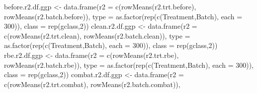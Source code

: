 \documentclass[
]{book}
\newenvironment{Shaded}{\begin{snugshade}}{\end{snugshade}}
\newcommand{\AttributeTok}[1]{\textcolor[rgb]{0.77,0.63,0.00}{#1}}
\newcommand{\DecValTok}[1]{\textcolor[rgb]{0.00,0.00,0.81}{#1}}
\newcommand{\FunctionTok}[1]{\textcolor[rgb]{0.00,0.00,0.00}{#1}}
\newcommand{\NormalTok}[1]{#1}
\newcommand{\OtherTok}[1]{\textcolor[rgb]{0.56,0.35,0.01}{#1}}
\newcommand{\StringTok}[1]{\textcolor[rgb]{0.31,0.60,0.02}{#1}}
\begin{document}
\begin{Shaded}
\begin{Highlighting}[]
\NormalTok{before.r2.df.ggp }\OtherTok{\textless{}{-}} \FunctionTok{data.frame}\NormalTok{(}\AttributeTok{r2 =} \FunctionTok{c}\NormalTok{(}\FunctionTok{rowMeans}\NormalTok{(r2.trt.before), }
                                      \FunctionTok{rowMeans}\NormalTok{(r2.batch.before)), }
                               \AttributeTok{type =} \FunctionTok{as.factor}\NormalTok{(}\FunctionTok{rep}\NormalTok{(}\FunctionTok{c}\NormalTok{(}\StringTok{\textquotesingle{}Treatment\textquotesingle{}}\NormalTok{,}\StringTok{\textquotesingle{}Batch\textquotesingle{}}\NormalTok{), }
                                                    \AttributeTok{each =} \DecValTok{300}\NormalTok{)),}
                               \AttributeTok{class =} \FunctionTok{rep}\NormalTok{(gclass,}\DecValTok{2}\NormalTok{))}
\NormalTok{clean.r2.df.ggp }\OtherTok{\textless{}{-}} \FunctionTok{data.frame}\NormalTok{(}\AttributeTok{r2 =} \FunctionTok{c}\NormalTok{(}\FunctionTok{rowMeans}\NormalTok{(r2.trt.clean), }
                                     \FunctionTok{rowMeans}\NormalTok{(r2.batch.clean)), }
                              \AttributeTok{type =} \FunctionTok{as.factor}\NormalTok{(}\FunctionTok{rep}\NormalTok{(}\FunctionTok{c}\NormalTok{(}\StringTok{\textquotesingle{}Treatment\textquotesingle{}}\NormalTok{,}\StringTok{\textquotesingle{}Batch\textquotesingle{}}\NormalTok{), }
                                                   \AttributeTok{each =} \DecValTok{300}\NormalTok{)),}
                              \AttributeTok{class =} \FunctionTok{rep}\NormalTok{(gclass,}\DecValTok{2}\NormalTok{))}
\NormalTok{rbe.r2.df.ggp }\OtherTok{\textless{}{-}} \FunctionTok{data.frame}\NormalTok{(}\AttributeTok{r2 =} \FunctionTok{c}\NormalTok{(}\FunctionTok{rowMeans}\NormalTok{(r2.trt.rbe), }
                                   \FunctionTok{rowMeans}\NormalTok{(r2.batch.rbe)), }
                            \AttributeTok{type =} \FunctionTok{as.factor}\NormalTok{(}\FunctionTok{rep}\NormalTok{(}\FunctionTok{c}\NormalTok{(}\StringTok{\textquotesingle{}Treatment\textquotesingle{}}\NormalTok{,}\StringTok{\textquotesingle{}Batch\textquotesingle{}}\NormalTok{), }
                                                 \AttributeTok{each =} \DecValTok{300}\NormalTok{)),}
                            \AttributeTok{class =} \FunctionTok{rep}\NormalTok{(gclass,}\DecValTok{2}\NormalTok{))}
\NormalTok{combat.r2.df.ggp }\OtherTok{\textless{}{-}} \FunctionTok{data.frame}\NormalTok{(}\AttributeTok{r2 =} \FunctionTok{c}\NormalTok{(}\FunctionTok{rowMeans}\NormalTok{(r2.trt.combat), }
                                      \FunctionTok{rowMeans}\NormalTok{(r2.batch.combat)), }

\end{Highlighting}
\end{Shaded}
\end{document}
